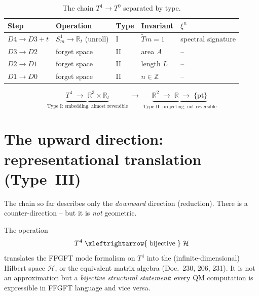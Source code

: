\begin{table}[h!]
\centering
\begin{tabular}{lllll}
\hline
\textbf{Step} & \textbf{Operation} & \textbf{Type} & \textbf{Invariant} & \textbf{$\xi^n$} \\
\hline
$D4\to D3{+}t$ & $S^1_m\to\mathbb{R}_t$ (unroll) & I & $\tilde{T}m=1$ & spectral signature \\
$D3\to D2$ & forget space & II & area $A$ & -- \\
$D2\to D1$ & forget space & II & length $L$ & -- \\
$D1\to D0$ & forget space & II & $n\in\mathbb{Z}$ & -- \\
\hline
\end{tabular}
\caption{The chain $T^4 \to T^0$ separated by type.}
\end{table}

\[
\underbrace{T^4 \;\longrightarrow\; \mathbb{R}^3\times\mathbb{R}_t}_{\text{Type I: embedding, almost reversible}}
\;\longrightarrow\;
\underbrace{\mathbb{R}^2 \;\longrightarrow\; \mathbb{R} \;\longrightarrow\; \{\mathrm{pt}\}}_{\text{Type II: projecting, not reversible}}
\]

\section{The upward direction: representational translation (Type~III)}

The chain so far describes only the \emph{downward} direction (reduction). There
is a counter-direction -- but it is \emph{not} geometric.

\begin{definition}\label{def:typeIII}
The operation
\[
  T^4 \;\xleftrightarrow{\;\text{bijective}\;}\; \mathcal{H}
\]
translates the FFGFT mode formalism on $T^4$ into the (infinite-dimensional)
Hilbert space $\mathcal{H}$, or the equivalent matrix algebra (Doc.~230, 206,
231). It is not an approximation but a \emph{bijective structural statement}:
every QM computation is expressible in FFGFT language and vice versa.
\end{definition}

